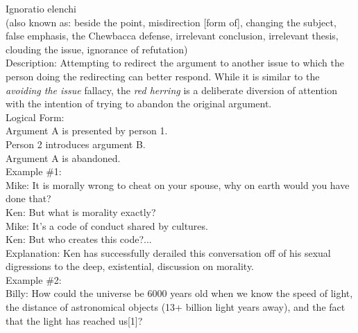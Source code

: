 \documentclass[a4paper,12pt,single,pdftex]{scrbook}
\begin{document}
{    
    

    
      
        Ignoratio elenchi
      \\

      
        (also known as: beside the point, misdirection [form of], changing the subject, false emphasis, the Chewbacca defense, irrelevant conclusion, irrelevant thesis, clouding the issue, ignorance of refutation)
      \\

      
        Description: Attempting to redirect the argument to another issue to which the person doing the redirecting can better respond. While it is similar to the {\it avoiding the issue} fallacy, the {\it red herring }is a deliberate diversion of attention with the intention of trying to abandon the original argument.
      \\

      
        Logical Form:
      \\

      
        Argument A is presented by person 1.
      \\

      
        Person 2 introduces argument B.
      \\

      
        Argument A is abandoned.
      \\

      
        Example \#1:
      \\

      
        Mike: It is morally wrong to cheat on your spouse, why on earth would you have done that?
      \\

      
        Ken: But what is morality exactly?
      \\

      
        Mike: It’s a code of conduct shared by cultures.
      \\

      
        Ken: But who creates this code?...
      \\

      
        Explanation: Ken has successfully derailed this conversation off of his sexual digressions to the deep, existential, discussion on morality.
      \\

      
        Example \#2:
      \\

      
        Billy: How could the universe be 6000 years old when we know the speed of light, the distance of astronomical objects (13+ billion light years away), and the fact that the light has reached us[1]?
      \\

}
\end{document}
